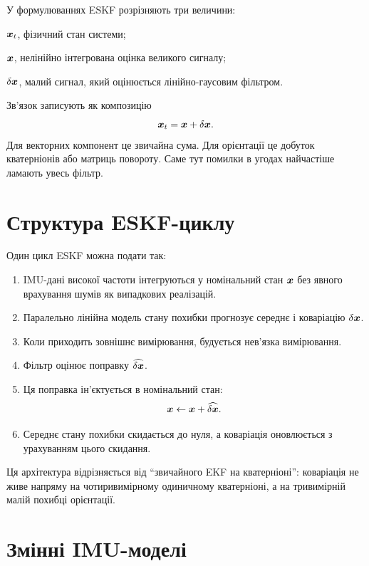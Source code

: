 У формулюваннях ESKF розрізняють три величини:
\begin{description}[leftmargin=2em]
\item[істинний стан] $\bm{x}_t$, фізичний стан системи;
\item[номінальний стан] $\bm{x}$, нелінійно інтегрована оцінка великого сигналу;
\item[стан похибки] $\delta\bm{x}$, малий сигнал, який оцінюється лінійно-гаусовим фільтром.
\end{description}

Зв'язок записують як композицію
\begin{equation}\label{eq:state_composition_generic}
\bm{x}_t=\bm{x}+\delta\bm{x}.
\end{equation}
Для векторних компонент це звичайна сума. Для орієнтації це добуток кватерніонів або матриць повороту. Саме тут помилки в угодах найчастіше ламають увесь фільтр.

\section{Структура ESKF-циклу}

Один цикл ESKF можна подати так:
\begin{enumerate}[leftmargin=2em]
\item IMU-дані високої частоти інтегруються у номінальний стан $\bm{x}$ без явного врахування шумів як випадкових реалізацій.
\item Паралельно лінійна модель стану похибки прогнозує середнє і коваріацію $\delta\bm{x}$.
\item Коли приходить зовнішнє вимірювання, будується нев'язка вимірювання.
\item Фільтр оцінює поправку $\widehat{\delta\bm{x}}$.
\item Ця поправка ін'єктується в номінальний стан:
\begin{equation}
\bm{x}\leftarrow \bm{x}+\widehat{\delta\bm{x}}.
\end{equation}
\item Середнє стану похибки скидається до нуля, а коваріація оновлюється з урахуванням цього скидання.
\end{enumerate}

Ця архітектура відрізняється від ``звичайного EKF на кватерніоні'': коваріація не живе напряму на чотиривимірному одиничному кватерніоні, а на тривимірній малій похибці орієнтації.

\section{Змінні IMU-моделі}

